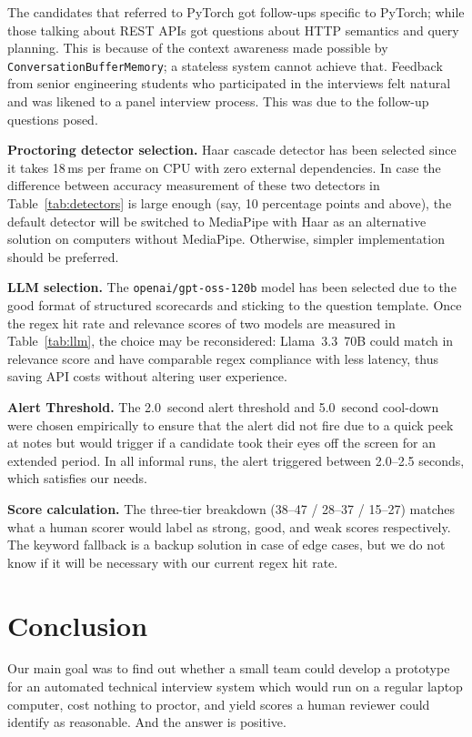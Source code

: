 \documentclass[conference]{IEEEtran}
\begin{document}
The candidates that referred to PyTorch got follow-ups specific to
PyTorch; while those talking about REST APIs got questions about HTTP
semantics and query planning. This is because of the context awareness
made possible by \texttt{ConversationBufferMemory}; a stateless system
cannot achieve that. Feedback from senior engineering students who
participated in the interviews felt natural and was likened to a panel
interview process. This was due to the follow-up questions posed.

\textbf{Proctoring detector selection.} Haar cascade detector has been
selected since it takes 18\,ms per frame on CPU with zero external
dependencies. In case the difference between accuracy measurement of
these two detectors in Table~\ref{tab:detectors} is large enough (say,
10 percentage points and above), the default detector will be switched
to MediaPipe with Haar as an alternative solution on computers without
MediaPipe. Otherwise, simpler implementation should be preferred.

\textbf{LLM selection.} The \texttt{openai/gpt-oss-120b} model has been
selected due to the good format of structured scorecards and sticking to
the question template. Once the regex hit rate and relevance scores of
two models are measured in Table~\ref{tab:llm}, the choice may be
reconsidered: Llama~3.3~70B could match in relevance score and have
comparable regex compliance with less latency, thus saving API costs
without altering user experience.

\textbf{Alert Threshold.} The 2.0~second alert threshold and
5.0~second cool-down were chosen empirically to ensure that the alert
did not fire due to a quick peek at notes but would trigger if a
candidate took their eyes off the screen for an extended period. In all
informal runs, the alert triggered between 2.0--2.5 seconds, which
satisfies our needs.

\textbf{Score calculation.} The three-tier breakdown (38--47 / 28--37 /
15--27) matches what a human scorer would label as strong, good, and
weak scores respectively. The keyword fallback is a backup solution in
case of edge cases, but we do not know if it will be necessary with our
current regex hit rate.

\section{Conclusion}
Our main goal was to find out whether a small team could develop a
prototype for an automated technical interview system which would run on
a regular laptop computer, cost nothing to proctor, and yield scores a
human reviewer could identify as reasonable. And the answer is positive.
\end{document}

